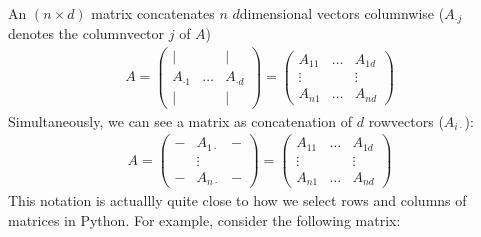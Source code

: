 \documentclass[letterpaper,10pt,english]{jupyterBook}
\begin{document}
\sphinxAtStartPar
An \((n\times d)\) matrix concatenates \(n\) \(d\)\sphinxhyphen{}dimensional vectors column\sphinxhyphen{}wise (\(A_{\cdot j}\) denotes the column\sphinxhyphen{}vector \(j\) of \(A\))
\begin{align*}
    A= \begin{pmatrix}
        \vert & & \vert\\
       A_{\cdot 1}&\ldots & A_{\cdot d}\\
\vert & & \vert
\end{pmatrix}
=\begin{pmatrix}
        A_{11 } & \ldots& A_{1d}\\
       \vdots& & \vdots\\
A_{n1} &\ldots & A_{nd} 
\end{pmatrix}
\end{align*}
\sphinxAtStartPar
Simultaneously, we can see a matrix as concatenation of \(d\) row\sphinxhyphen{}vectors (\(A_{i\cdot}\)):
\begin{align*}
    A= \begin{pmatrix}
        - & A_{1\cdot} & -\\
       &\vdots & \\
- & A_{n\cdot} & -
\end{pmatrix}
=\begin{pmatrix}
        A_{11 } & \ldots& A_{1d}\\
       \vdots& & \vdots\\
A_{n1} &\ldots & A_{nd} 
\end{pmatrix}
\end{align*}
\sphinxAtStartPar
This notation is actuallly quite close to how we select rows and columns of matrices in Python. For example, consider the following matrix:
\end{document}
